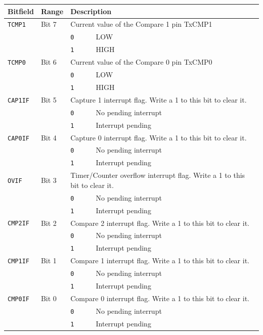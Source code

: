 \begin{tabularx}{\textwidth}{ l l l X }
\textbf{Bitfield} & \textbf{Range} & \multicolumn{2}{X}{\textbf{Description}} \\ \hline
\texttt{TCMP1} & Bit 7 & \multicolumn{2}{X}{Current value of the Compare 1 pin TxCMP1} \\
 & & \texttt{0} & LOW \\
 & & \cellcolor{tablehighlightcolor}\texttt{1} & \cellcolor{tablehighlightcolor}HIGH \\
\hline
\texttt{TCMP0} & Bit 6 & \multicolumn{2}{X}{Current value of the Compare 0 pin TxCMP0} \\
 & & \texttt{0} & LOW \\
 & & \cellcolor{tablehighlightcolor}\texttt{1} & \cellcolor{tablehighlightcolor}HIGH \\
\hline
\texttt{CAP1IF} & Bit 5 & \multicolumn{2}{X}{Capture 1 interrupt flag. Write a 1 to this bit to clear it.} \\
 & & \texttt{0} & No pending interrupt \\
 & & \cellcolor{tablehighlightcolor}\texttt{1} & \cellcolor{tablehighlightcolor}Interrupt pending \\
\hline
\texttt{CAP0IF} & Bit 4 & \multicolumn{2}{X}{Capture 0 interrupt flag. Write a 1 to this bit to clear it.} \\
 & & \texttt{0} & No pending interrupt \\
 & & \cellcolor{tablehighlightcolor}\texttt{1} & \cellcolor{tablehighlightcolor}Interrupt pending \\
\hline
\texttt{OVIF} & Bit 3 & \multicolumn{2}{X}{Timer/Counter overflow interrupt flag. Write a 1 to this bit to clear it.} \\
 & & \texttt{0} & No pending interrupt \\
 & & \cellcolor{tablehighlightcolor}\texttt{1} & \cellcolor{tablehighlightcolor}Interrupt pending \\
\hline
\texttt{CMP2IF} & Bit 2 & \multicolumn{2}{X}{Compare 2 interrupt flag. Write a 1 to this bit to clear it.} \\
 & & \texttt{0} & No pending interrupt \\
 & & \cellcolor{tablehighlightcolor}\texttt{1} & \cellcolor{tablehighlightcolor}Interrupt pending \\
\hline
\texttt{CMP1IF} & Bit 1 & \multicolumn{2}{X}{Compare 1 interrupt flag. Write a 1 to this bit to clear it.} \\
 & & \texttt{0} & No pending interrupt \\
 & & \cellcolor{tablehighlightcolor}\texttt{1} & \cellcolor{tablehighlightcolor}Interrupt pending \\
\hline
\texttt{CMP0IF} & Bit 0 & \multicolumn{2}{X}{Compare 0 interrupt flag. Write a 1 to this bit to clear it.} \\
 & & \texttt{0} & No pending interrupt \\
 & & \cellcolor{tablehighlightcolor}\texttt{1} & \cellcolor{tablehighlightcolor}Interrupt pending \\
\hline
\end{tabularx}

